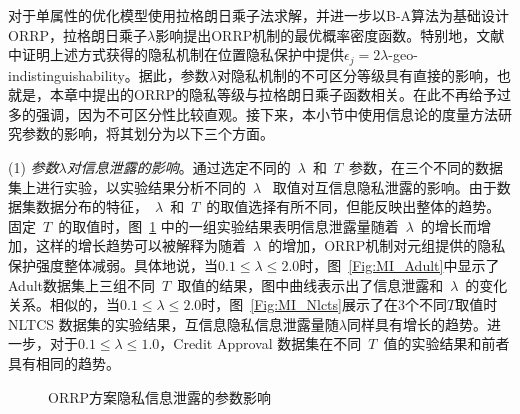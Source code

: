 对于单属性的优化模型使用拉格朗日乘子法求解，并进一步以B-A算法为基础设计ORRP，拉格朗日乘子$\lambda$影响提出ORRP机制的最优概率密度函数。特别地，文献中证明上述方式获得的隐私机制在位置隐私保护中提供$\epsilon_j=2\lambda$-geo-indistinguishability。据此，参数$\lambda$对隐私机制的不可区分等级具有直接的影响，也就是，本章中提出的ORRP的隐私等级与拉格朗日乘子函数相关。在此不再给予过多的强调，因为不可区分性比较直观。接下来，本小节中使用信息论的度量方法研究参数的影响，将其划分为以下三个方面。


(1) {\em 参数$\lambda$对信息泄露的影响}。通过选定不同的~$\lambda$~和~$T$~参数，在三个不同的数据集上进行实验，以实验结果分析不同的~$\lambda$~ 取值对互信息隐私泄露的影响。由于数据集数据分布的特征，~$\lambda$~和~$T$~的取值选择有所不同，但能反映出整体的趋势。固定~$T$~的取值时，图~\ref{Fig:6} 中的一组实验结果表明信息泄露量随着~$\lambda$~的增长而增加，这样的增长趋势可以被解释为随着~$\lambda$~的增加，ORRP机制对元组提供的隐私保护强度整体减弱。具体地说，当$0.1 \leq \lambda \leq 2.0$时，图~\ref{Fig:MI_Adult}中显示了Adult数据集上三组不同~$T$~取值的结果，图中曲线表示出了信息泄露和~$\lambda$~的变化关系。相似的，当$0.1 \leq \lambda \leq 2.0$时，图~\ref{Fig:MI_Nlcts}展示了在3个不同$T$取值时NLTCS 数据集的实验结果，互信息隐私信息泄露量随$\lambda$同样具有增长的趋势。进一步，对于$0.1 \leq \lambda \leq 1.0$，Credit Approval 数据集在不同~$T$~值的实验结果和前者具有相同的趋势。
\begin{figure}[htbp]
\centering
{}%
%
%
\vspace{-0.3cm}
\centering
\caption{ORRP方案隐私信息泄露的参数影响}
\label{Fig:6}
\end{figure}
\vspace{-0.1cm}

